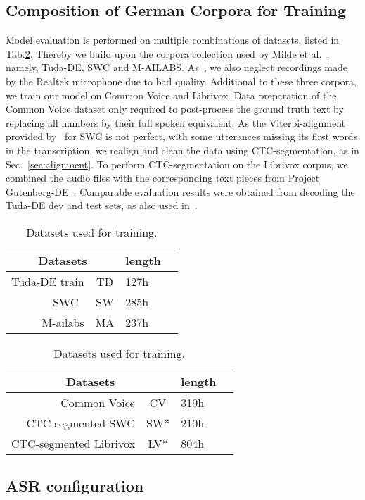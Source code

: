 \documentclass[runningheads]{llncs}
\begin{document}
\subsection{Composition of German Corpora for Training}
Model evaluation is performed on multiple combinations of datasets, listed in Tab.\ref{table:datasets}.
Thereby we build upon the corpora collection used by Milde et al.~\cite{Milde2018}, namely, Tuda-DE, SWC and M-AILABS.
As~\cite{Milde2018}, we also neglect recordings made by the Realtek microphone due to bad quality.
Additional to these three corpora, we train our model on Common Voice and Librivox.
Data preparation of the Common Voice dataset only required to post-process the ground truth text by replacing all numbers by their full spoken equivalent.
As the Viterbi-alignment provided by~\cite{Milde2018} for SWC is not perfect, with some utterances missing its first words in the transcription, we realign and clean the data using CTC-segmentation, as in Sec.~\ref{sec:alignment}.
To perform CTC-segmentation on the Librivox corpus,
we combined the audio files with the corresponding text pieces from Project Gutenberg-DE~\cite{Gutenberg2019}.
Comparable evaluation results were obtained from decoding the Tuda-DE dev and test sets, as also used in~\cite{Milde2018}.

\begin{table}[tb!]\centering
  \caption{Datasets used for training.}\begin{tabular}{r|c|l l}\toprule
    \multicolumn{2}{c|}{\textbf{Datasets}} & \textbf{length} \\ \midrule
	Tuda-DE train & TD & 127h \\
SWC~\cite{Milde2018} & SW & 285h \\
    M-ailabs & MA & 237h \\ \bottomrule 
    \end{tabular}
\qquad
  \begin{tabular}{r|c|l l}\toprule
    \multicolumn{2}{c|}{\textbf{Datasets}} & \textbf{length} \\ \midrule
    Common Voice & CV & 319h \\
    CTC-segmented SWC & SW* & 210h \\ 
    CTC-segmented Librivox & LV* & 804h \\ \bottomrule 
    \end{tabular}
  \label{table:datasets}
\end{table}


\subsection{ASR configuration}
\end{document}
